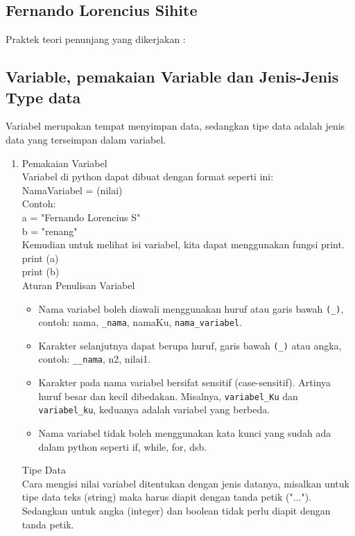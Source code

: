 \begin{enumerate}
\section{Fernando Lorencius Sihite}
Praktek teori penunjang yang dikerjakan :
\subsection{Variable, pemakaian Variable dan Jenis-Jenis Type data}
Variabel merupakan tempat menyimpan data, sedangkan tipe data adalah jenis data yang terseimpan dalam variabel.\\


\begin{enumerate}
\item Pemakaian Variabel\\
Variabel di python dapat dibuat dengan format seperti ini:\\
NamaVariabel = (nilai)\\
Contoh:\\
a = "Fernando Lorencius S"\\
b = "renang"\\
Kemudian untuk melihat isi variabel, kita dapat menggunakan fungsi print.\\
print (a)\\
print (b)\\
Aturan Penulisan Variabel\\
\begin{itemize}
\item Nama variabel boleh diawali menggunakan huruf atau garis bawah \verb|(_)|, contoh: nama, \verb|_nama|, namaKu, \verb|nama_variabel|.
\item Karakter selanjutnya dapat berupa huruf, garis bawah \verb|(_)| atau angka, contoh: \verb|__nama|, n2, nilai1.
\item Karakter pada nama variabel bersifat sensitif (case-sensitif). Artinya huruf besar dan kecil dibedakan. Misalnya, \verb|variabel_Ku| dan \verb|variabel_ku|, keduanya adalah variabel yang berbeda.
\item Nama variabel tidak boleh menggunakan kata kunci yang sudah ada dalam python seperti if, while, for, dsb.
\end{itemize}
Tipe Data\\
Cara mengisi nilai variabel ditentukan dengan jenis datanya, misalkan untuk tipe data teks (string) maka harus diapit dengan tanda petik ("..."). Sedangkan untuk angka (integer) dan boolean tidak perlu diapit dengan tanda petik.\\

\end{enumerate}
\end{enumerate}
